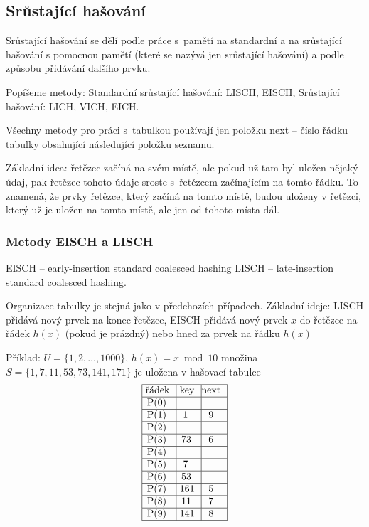 \documentclass[a4paper,12pt]{article}
\begin{document}
\subsection{Srůstající hašování}

Srůstající hašování se dělí podle práce s~pamětí na standardní a na srůstající hašování 
s pomocnou pamětí (které se nazývá jen 
srůstající hašování) a podle způsobu 
přidávání dalšího prvku.

Popíšeme metody:\newline 
\phantom{---}Standardní srůstající hašování: LISCH, EISCH,\newline 
\phantom{---}Srůstající hašování: LICH, VICH, EICH.

Všechny metody pro práci s~tabulkou používají jen 
položku next -- číslo řádku tabulky obsahující 
následující položku seznamu. 

Základní idea: řetězec začíná na svém místě, ale 
pokud už tam byl uložen 
nějaký údaj, pak řetězec tohoto údaje sroste s~řetězcem 
začínajícím na tomto řádku. To znamená, že prvky řetězce, který začíná na tomto místě, budou uloženy v řetězci, který už je uložen na tomto místě, ale jen od tohoto místa dál.

\subsubsection{Metody EISCH a LISCH}

\phantom{---}EISCH -- early-insertion standard coalesced hashing\newline 
\phantom{---}LISCH -- late-insertion standard coalesced hashing.
 

Organizace tabulky je stejná jako v předchozích 
případech.\newline 
Základní ideje: LISCH přidává nový prvek na konec 
řetězce, \newline 
EISCH přidává nový prvek $x$ do řetězce na 
řádek $h(x)$ (pokud je prázdný) nebo hned za prvek na řádku $h(x)$\newline 

Příklad: $U=\{1,2,\dots,1000\}$, $h(x)=x\bmod10$\newline 
množina $S=\{1,7,11,53,73,141,171\}$ je uložena 
v hašovací tabulce
$$\vtop{\offinterlineskip\halign {\strut\vrule\ # & \vrule\ # & \vrule \hfil # \hfil \vrule\cr\noalign{\hrule}řádek & key & next \hfil \cr\noalign{\hrule}P(0) & &\hfill \cr\noalign{\hrule}P(1) & 1 & 9 \cr\noalign{\hrule}P(2) & &\hfill \cr\noalign{\hrule}P(3) & 73 & 6 \cr\noalign{\hrule}P(4) &  &\hfill \cr\noalign{\hrule}P(5) & 7 & \hfill \cr\noalign{\hrule}P(6) & 53 &\hfill \cr\noalign{\hrule}P(7) & 161 & 5 \cr\noalign{\hrule}P(8) & 11 & 7  \cr\noalign{\hrule}P(9) & 141 & 8 \cr\noalign{\hrule}}}$$
\end{document}
